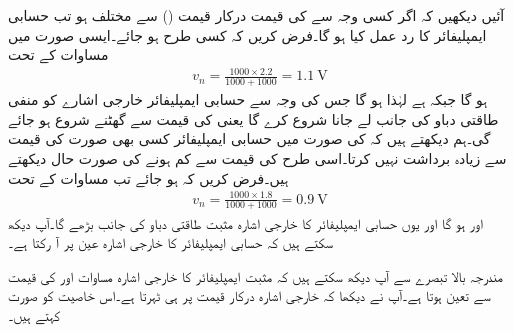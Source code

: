 آئیں دیکھیں کہ اگر کسی وجہ سے  کی قیمت درکار قیمت () سے مختلف ہو تب حسابی ایمپلیفائر کا رد عمل کیا ہو گا۔فرض کریں  کہ کسی طرح  ہو جائے۔ایسی صورت میں مساوات  کے تحت
\begin{align*}
v_n=\frac{1000 \times 2.2}{1000+1000}=\SI{1.1}{\volt}
\end{align*}
ہو گا جبکہ  ہے لہٰذا  ہو گا جس کی وجہ سے حسابی ایمپلیفائر خارجی اشارے کو منفی طاقتی دباو کی جانب لے جانا شروع کرے گا یعنی  کی قیمت  سے گھٹنے شروع ہو جائے گی۔ہم دیکھتے ہیں کہ   کی صورت میں حسابی ایمپلیفائر کسی بھی صورت  کی قیمت  سے زیادہ برداشت نہیں کرتا۔اسی طرح   کی قیمت  سے کم ہونے کی صورت حال دیکھتے ہیں۔فرض کریں کہ  ہو جائے تب مساوات   کے تحت
\begin{align*}
v_n=\frac{1000 \times 1.8}{1000+1000}=\SI{0.9}{\volt}
\end{align*}
 اور  ہو گا اور یوں حسابی ایمپلیفائر کا خارجی اشارہ   مثبت طاقتی دباو کی جانب بڑھے گا۔آپ دیکھ سکتے ہیں کہ حسابی ایمپلیفائر کا خارجی اشارہ عین  پر آ رکتا ہے۔

مندرجہ بالا تبصرے سے آپ دیکھ سکتے ہیں کہ مثبت ایمپلیفائر کا خارجی اشارہ مساوات  اور  کی قیمت سے تعین ہوتا ہے۔آپ نے دیکھا کہ خارجی اشارہ درکار قیمت پر ہی ٹہرتا ہے۔اس خاصیت کو  صورت کہتے ہیں۔ 

